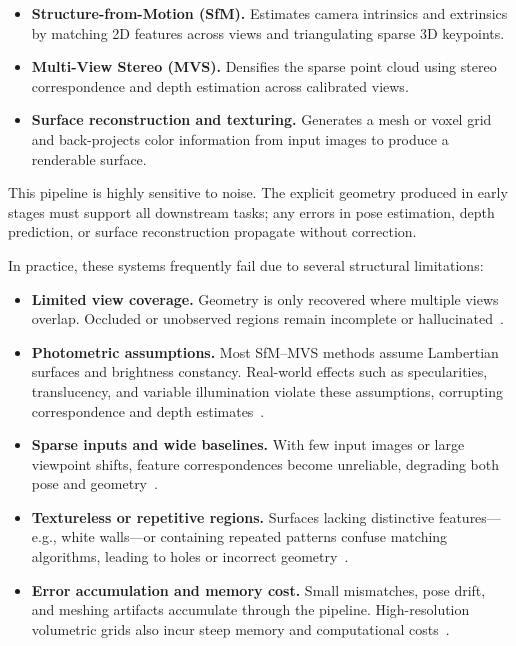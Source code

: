\begin{itemize}
    \item \textbf{Structure-from-Motion (SfM).} Estimates camera intrinsics and extrinsics by matching 2D features across views and triangulating sparse 3D keypoints.
    
    \item \textbf{Multi-View Stereo (MVS).} Densifies the sparse point cloud using stereo correspondence and depth estimation across calibrated views.
    
    \item \textbf{Surface reconstruction and texturing.} Generates a mesh or voxel grid and back-projects color information from input images to produce a renderable surface.
\end{itemize}

This pipeline is highly sensitive to noise. The explicit geometry produced in early stages must support all downstream tasks; any errors in pose estimation, depth prediction, or surface reconstruction propagate without correction. 

\newpage

In practice, these systems frequently fail due to several structural limitations:

\begin{itemize}
    \item \textbf{Limited view coverage.} Geometry is only recovered where multiple views overlap. Occluded or unobserved regions remain incomplete or hallucinated~\cite{seitz2006_multiview}.
    
    \item \textbf{Photometric assumptions.} Most SfM–MVS methods assume Lambertian surfaces and brightness constancy. Real-world effects such as specularities, translucency, and variable illumination violate these assumptions, corrupting correspondence and depth estimates~.
    
    \item \textbf{Sparse inputs and wide baselines.} With few input images or large viewpoint shifts, feature correspondences become unreliable, degrading both pose and geometry~\cite{aanaes2016_mvs}.
    
    \item \textbf{Textureless or repetitive regions.} Surfaces lacking distinctive features—e.g., white walls—or containing repeated patterns confuse matching algorithms, leading to holes or incorrect geometry~\cite{zhang2001_shape_motion}.
    
    \item \textbf{Error accumulation and memory cost.} Small mismatches, pose drift, and meshing artifacts accumulate through the pipeline. High-resolution volumetric grids also incur steep memory and computational costs~\cite{seitz2006_multiview}.
\end{itemize}

